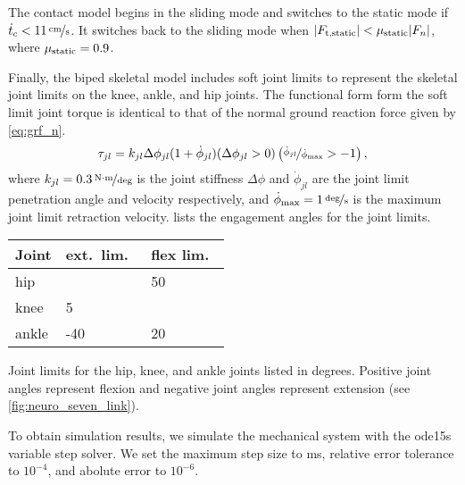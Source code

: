 The contact model begins in the sliding mode and switches to the static mode if
$\dot t_c < 1 \unitfrac[1]{cm}{s}$. It switches back to the sliding mode when $|
F_{\textnormal{t,static}} | < \mu_{\textnormal{static}} | F_n |$, where $\mu_{\textnormal{static}} = 0.9$.

Finally, the biped skeletal model includes soft joint limits to represent
the skeletal joint limits on the knee, ankle, and hip joints. The functional
form form the soft limit joint torque is identical to that of the normal ground
reaction force given by \cref{eq:grf_n}.
\begin{align}
    \tau_{jl} = k_{jl} \Delta \phi_{jl} (1 + \dot \phi_{jl}) (\Delta
    \phi_{jl}  > 0) \left(\nicefrac{\dot \phi_{jl}}{\dot \phi_{\textnormal{max}}} > -1
    \right), 
    \label{eq:tau_joint_limit}
\end{align}
where $k_{jl} = \unitfrac[0.3]{N \cdot m}{deg}$ is the joint stiffness $\Delta
\phi$ and $\dot \phi_{jl}$ are the joint limit penetration angle and
velocity respectively, and $\dot \phi_\tn{max} = \unitfrac[1]{deg}{s}$ is the
maximum joint limit retraction velocity.  lists the
engagement angles for the joint limits.
\begin{margintable}[-0.65in]
  \centering
      \begin{tabular}{lll}
        \toprule
        Joint & ext.\ lim.\ & flex lim.\ \\
        \midrule
        hip   &     & 50 \\
        knee  &   5 &    \\
        ankle & -40 & 20 \\
        \bottomrule
      \end{tabular}
  \caption{Joint limits for the hip, knee, and ankle joints listed in degrees.
  Positive joint angles represent flexion and negative joint angles represent
  extension (see \cref{fig:neuro_seven_link}).}\label{tab:joint_lim}
\end{margintable}

To obtain simulation results, we simulate the mechanical system with the ode15s
variable step solver. We set the maximum step size to \unit[10]{ms}, relative
error tolerance to $10^{-4}$, and abolute error to $10^{-6}$.

